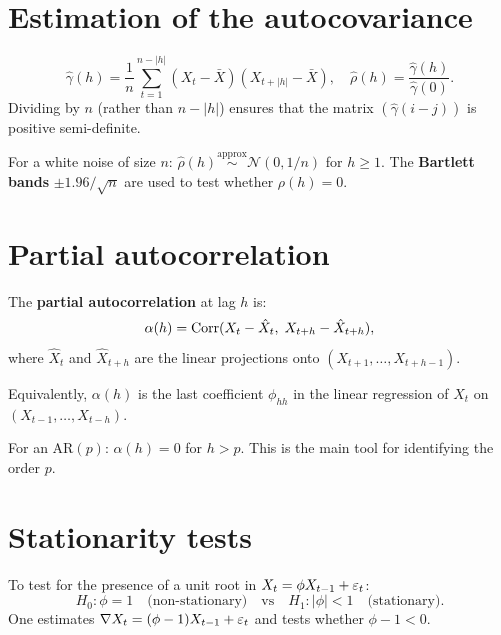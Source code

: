 \section{Estimation of the autocovariance}

\begin{definition}
\[
\hat{\gamma}(h) = \frac{1}{n}\sum_{t=1}^{n-|h|}(X_t-\bar{X})(X_{t+|h|}-\bar{X}), \quad \hat{\rho}(h)=\frac{\hat{\gamma}(h)}{\hat{\gamma}(0)}.
\]
Dividing by $n$ (rather than $n-|h|$) ensures that the matrix $(\hat{\gamma}(i-j))$ is positive semi-definite.
\end{definition}

\begin{theorem}[Bartlett]
For a white noise of size $n$: $\hat{\rho}(h)\stackrel{\text{approx}}{\sim}\mathcal{N}(0,1/n)$ for $h\geq 1$. The \textbf{Bartlett bands} $\pm 1.96/\sqrt{n}$ are used to test whether $\rho(h)=0$.
\end{theorem}

\section{Partial autocorrelation}

\begin{definition}[PACF]
The \textbf{partial autocorrelation} at lag $h$ is:
\[
\alpha(h) = \operatorname{Corr}(X_t-\hat{X}_t,\;X_{t+h}-\hat{X}_{t+h}),
\]
where $\hat{X}_t$ and $\hat{X}_{t+h}$ are the linear projections onto $(X_{t+1},\ldots,X_{t+h-1})$.

Equivalently, $\alpha(h)$ is the last coefficient $\phi_{hh}$ in the linear regression of $X_t$ on $(X_{t-1},\ldots,X_{t-h})$.
\end{definition}

\begin{theorem}
For an AR$(p)$: $\alpha(h)=0$ for $h>p$. This is the main tool for identifying the order $p$.
\end{theorem}

\section{Stationarity tests}

\begin{definition}
To test for the presence of a unit root in $X_t = \phi X_{t-1}+\varepsilon_t$:
\[
H_0 : \phi=1 \quad\text{(non-stationary)} \quad \text{vs} \quad H_1 : |\phi|<1 \quad\text{(stationary)}.
\]
One estimates $\nabla X_t = (\phi-1)X_{t-1}+\varepsilon_t$ and tests whether $\phi-1<0$.
\end{definition}

